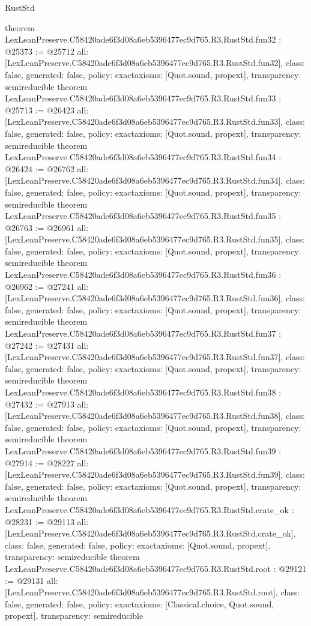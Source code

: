 \begin{lexlean}{RustStd}
\begin{coremodule}
{}
theorem LexLeanPreserve.C58420ade6f3d08a6eb5396477ec9d765.R3.RustStd.fun32 : @25373 := @25712 {
  all: [LexLeanPreserve.C58420ade6f3d08a6eb5396477ec9d765.R3.RustStd.fun32],
  class: false,
  generated: false,
  policy: exact{axioms: [Quot.sound, propext]},
  transparency: semireducible
}
theorem LexLeanPreserve.C58420ade6f3d08a6eb5396477ec9d765.R3.RustStd.fun33 : @25713 := @26423 {
  all: [LexLeanPreserve.C58420ade6f3d08a6eb5396477ec9d765.R3.RustStd.fun33],
  class: false,
  generated: false,
  policy: exact{axioms: [Quot.sound, propext]},
  transparency: semireducible
}
theorem LexLeanPreserve.C58420ade6f3d08a6eb5396477ec9d765.R3.RustStd.fun34 : @26424 := @26762 {
  all: [LexLeanPreserve.C58420ade6f3d08a6eb5396477ec9d765.R3.RustStd.fun34],
  class: false,
  generated: false,
  policy: exact{axioms: [Quot.sound, propext]},
  transparency: semireducible
}
theorem LexLeanPreserve.C58420ade6f3d08a6eb5396477ec9d765.R3.RustStd.fun35 : @26763 := @26961 {
  all: [LexLeanPreserve.C58420ade6f3d08a6eb5396477ec9d765.R3.RustStd.fun35],
  class: false,
  generated: false,
  policy: exact{axioms: [Quot.sound, propext]},
  transparency: semireducible
}
theorem LexLeanPreserve.C58420ade6f3d08a6eb5396477ec9d765.R3.RustStd.fun36 : @26962 := @27241 {
  all: [LexLeanPreserve.C58420ade6f3d08a6eb5396477ec9d765.R3.RustStd.fun36],
  class: false,
  generated: false,
  policy: exact{axioms: [Quot.sound, propext]},
  transparency: semireducible
}
theorem LexLeanPreserve.C58420ade6f3d08a6eb5396477ec9d765.R3.RustStd.fun37 : @27242 := @27431 {
  all: [LexLeanPreserve.C58420ade6f3d08a6eb5396477ec9d765.R3.RustStd.fun37],
  class: false,
  generated: false,
  policy: exact{axioms: [Quot.sound, propext]},
  transparency: semireducible
}
theorem LexLeanPreserve.C58420ade6f3d08a6eb5396477ec9d765.R3.RustStd.fun38 : @27432 := @27913 {
  all: [LexLeanPreserve.C58420ade6f3d08a6eb5396477ec9d765.R3.RustStd.fun38],
  class: false,
  generated: false,
  policy: exact{axioms: [Quot.sound, propext]},
  transparency: semireducible
}
theorem LexLeanPreserve.C58420ade6f3d08a6eb5396477ec9d765.R3.RustStd.fun39 : @27914 := @28227 {
  all: [LexLeanPreserve.C58420ade6f3d08a6eb5396477ec9d765.R3.RustStd.fun39],
  class: false,
  generated: false,
  policy: exact{axioms: [Quot.sound, propext]},
  transparency: semireducible
}
theorem LexLeanPreserve.C58420ade6f3d08a6eb5396477ec9d765.R3.RustStd.crate_ok : @28231 := @29113 {
  all: [LexLeanPreserve.C58420ade6f3d08a6eb5396477ec9d765.R3.RustStd.crate_ok],
  class: false,
  generated: false,
  policy: exact{axioms: [Quot.sound, propext]},
  transparency: semireducible
}
theorem LexLeanPreserve.C58420ade6f3d08a6eb5396477ec9d765.R3.RustStd.root : @29121 := @29131 {
  all: [LexLeanPreserve.C58420ade6f3d08a6eb5396477ec9d765.R3.RustStd.root],
  class: false,
  generated: false,
  policy: exact{axioms: [Classical.choice, Quot.sound, propext]},
  transparency: semireducible
}


\end{coremodule}
\end{lexlean}
